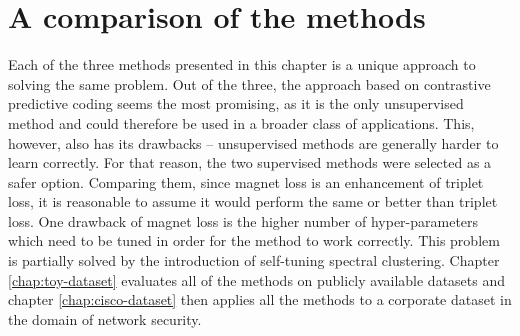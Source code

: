 \section{A comparison of the methods}\label{sec:clustering-loss-comparison}
Each of the three methods presented in this chapter is a unique approach to solving the same problem. Out of the three, the approach based on contrastive predictive coding seems the most promising, as it is the only unsupervised method and could therefore be used in a broader class of applications. This, however, also has its drawbacks -- unsupervised methods are generally harder to learn correctly. For that reason, the two supervised methods were selected as a safer option. Comparing them, since magnet loss is an enhancement of triplet loss, it is reasonable to assume it would perform the same or better than triplet loss. One drawback of magnet loss is the higher number of hyper-parameters which need to be tuned in order for the method to work correctly. This problem is partially solved by the introduction of self-tuning spectral clustering. Chapter \ref{chap:toy-dataset} evaluates all of the methods on publicly available datasets and chapter \ref{chap:cisco-dataset} then applies all the methods to a corporate dataset in the domain of network security.
